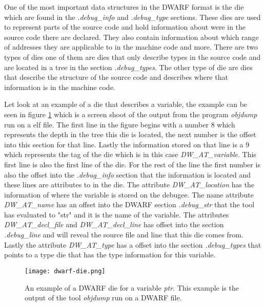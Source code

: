  


One of the most important data structures in the \gls{DWARF} format is the \gls{die} which are found in the \emph{.debug\_info} and \emph{.debug\_type} sections.
These \glspl{die} are used to represent parts of the source code and hold information about were in the source code there are declared.
They also contain information about which range of addresses they are applicable to in the machine code and more.
There are two types of \glspl{die} one of them are dies that only describe types in the source code and are located in a \gls{tree} in the section \emph{.debug\_types}.
The other type of \gls{die} are dies that describe the structure of the source code and describes where that information is in the machine code.


Let look at an example of a \gls{die} that describes a variable, the example can be seen in figure \ref{fig:dwarfdie} which is a screen shoot of the output from the program \emph{objdump} run on a \gls{elf} file.
The first line in the figure begins with a number $8$ which represents the depth in the tree this \gls{die} is located, the next number is the offset into this section for that line.
Lastly the information stored on that line is a $9$ which represents the tag of the \gls{die} which is in this case \emph{DW\_AT\_variable}.
This first line is also the first line of the die.
For the rest of the line the first number is also the offset into the \emph{.debug\_info} section that the information is located and these lines are attributes to in the \gls{die}.
The attribute \emph{DW\_AT\_location} has the information of where the variable is stored on the \gls{debugee}.
The name attribute \emph{DW\_AT\_name} has an offset into the \gls{DWARF} section \emph{.debug\_str} that the tool has evaluated to "str" and it is the name of the variable.
The attributes \emph{DW\_AT\_decl\_file} and \emph{DW\_AT\_decl\_line} has offset into the section \emph{.debug\_line} and will reveal the source file and line that this \gls{die} comes from.
Lastly the attribute \emph{DW\_AT\_type} has a offset into the section \emph{.debug\_types} that points to a type \gls{die} that has the type information for this variable.


\begin{figure}[h]
	\centering
	\texttt{[image: dwarf-die.png]}
	\caption{An example of a \gls{DWARF} \gls{die} for a variable \emph{ptr}. This example is the output of the tool \emph{objdump} run on a \gls{DWARF} file.}
	\label{fig:dwarfdie}
\end{figure}

